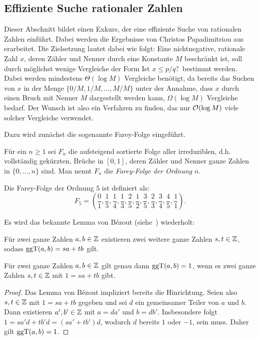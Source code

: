 \subsection{Effiziente Suche rationaler Zahlen}\label{sec-rational-search}

Dieser Abschnitt bildet einen Exkurs, der eine effiziente Suche von rationalen Zahlen einführt.
Dabei werden die Ergebnisse von Christos Papadimitriou aus~\cite{Papadimitriou1979} erarbeitet.
Die Zielsetzung lautet dabei wie folgt:
Eine nichtnegative, rationale Zahl $x$, deren Zähler und Nenner durch eine Konstante $M$ beschränkt ist, soll durch möglichst wenige Vergleiche der Form \glqq Ist $x\leq p/q$?\grqq\ bestimmt werden.
Dabei werden mindestens $\Theta(\log M)$ Vergleiche benötigt, da bereits das Suchen von $x$ in der Menge $\{ 0/M, 1/M, \dots, M/M \}$ unter der Annahme, dass $x$ durch einen Bruch mit Nenner $M$ dargestellt werden kann, $\Omega(\log M)$ Vergleiche bedarf.
Der Wunsch ist also ein Verfahren zu finden, das nur $\mathcal{O}(\log M)$ viele solcher Vergleiche verwendet.

Dazu wird zunächst die sogenannte Farey-Folge eingeführt.

\begin{definition}
	Für ein $n\geq 1$ sei $F_n$ die aufsteigend sortierte Folge aller irreduziblen, d.h. vollständig gekürzten, Brüche in $[0,1]$, deren Zähler und Nenner ganze Zahlen in $\{0, \dots, n\}$ sind.
	Man nennt $F_n$ die \emph{Farey-Folge der Ordnung $n$}.
\end{definition}

\begin{example}
	Die Farey-Folge der Ordnung $5$ ist definiert als:
	\[
		F_5 = \left( \frac{0}{1}, \frac{1}{5}, \frac{1}{4}, \frac{1}{3}, \frac{2}{5}, \frac{1}{2}, \frac{3}{5}, \frac{2}{3}, \frac{3}{4}, \frac{4}{5}, \frac{1}{1} \right).
	\]
\end{example}

Es wird das bekannte Lemma von Bézout (siehe~\cite[Satz 3.5]{Algebra2008}) wiederholt:
\begin{lemma}\label{lemma-von-bezout}
	Für zwei ganze Zahlen $a, b\in\mathbb{Z}$ existieren zwei weitere ganze Zahlen $s,t\in\mathbb{Z}$, sodass $\operatorname{ggT}(a,b) = sa + tb$ gilt.
\end{lemma}

\begin{corollary}\label{cor-bezout-reverted}
	Für zwei ganze Zahlen $a,b\in\mathbb{Z}$ gilt genau dann $\operatorname{ggT}(a,b) = 1$, wenn es zwei ganze Zahlen $s,t\in\mathbb{Z}$ mit $1 = sa + tb$ gibt.
\end{corollary}
\begin{proof}
	Das Lemma von Bézout impliziert bereits die Hinrichtung.
	Seien also $s,t\in\mathbb{Z}$ mit $1= sa +tb$ gegeben und sei $d$ ein gemeinsamer Teiler von $a$ und $b$.
	Dann existieren $a',b'\in\mathbb{Z}$ mit $a=d a'$ und $b=d b'$.
	Insbesondere folgt $1 = sa'd + tb'd = (sa' + tb') d$, wodurch $d$ bereits $1$ oder $-1$, sein muss.
	Daher gilt $\operatorname{ggT}(a,b)=1$.
\end{proof}

